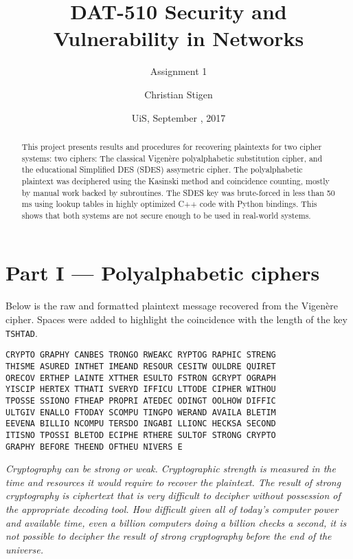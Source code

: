 \documentclass[a4paper,english,12pt]{article}
\title{DAT-510 Security and Vulnerability in Networks}
\subtitle{Assignment 1}
\author{Christian Stigen}
\date{UiS, September \nth{18}, 2017}
\begin{document}
\maketitle

\begin{abstract}
This project presents results and procedures for recovering plaintexts for two
  cipher systems: two ciphers: The classical Vigenère polyalphabetic
  substitution cipher, and the educational Simplified DES (SDES) assymetric
  cipher. The polyalphabetic plaintext was deciphered using the Kasinski method
  and coincidence counting, mostly by manual work backed by subroutines.  The
  SDES key was brute-forced in less than 50 ms using lookup tables in highly
  optimized C++ code with Python bindings. This shows that both systems are not
  secure enough to be used in real-world systems.
\end{abstract}

\section{Part I --- Polyalphabetic ciphers}

Below is the raw and formatted plaintext message recovered from the Vigenère
cipher\cite{wiki:vigenere, wiki:polyalphabetic}. Spaces were added to highlight
the coincidence with the length of the key \texttt{TSHTAD}.

\begin{verbatim}
CRYPTO GRAPHY CANBES TRONGO RWEAKC RYPTOG RAPHIC STRENG
THISME ASURED INTHET IMEAND RESOUR CESITW OULDRE QUIRET
ORECOV ERTHEP LAINTE XTTHER ESULTO FSTRON GCRYPT OGRAPH
YISCIP HERTEX TTHATI SVERYD IFFICU LTTODE CIPHER WITHOU
TPOSSE SSIONO FTHEAP PROPRI ATEDEC ODINGT OOLHOW DIFFIC
ULTGIV ENALLO FTODAY SCOMPU TINGPO WERAND AVAILA BLETIM
EEVENA BILLIO NCOMPU TERSDO INGABI LLIONC HECKSA SECOND
ITISNO TPOSSI BLETOD ECIPHE RTHERE SULTOF STRONG CRYPTO
GRAPHY BEFORE THEEND OFTHEU NIVERS E
\end{verbatim}

\textit{Cryptography can be strong or weak. Cryptographic strength is measured
in the time and resources it would require to recover the plaintext.  The
result of strong cryptography is ciphertext that is very difficult to decipher
without possession of the appropriate decoding tool. How difficult given all of
today's computer power and available time, even a billion computers doing a
billion checks a second, it is not possible to decipher the result of strong
cryptography before the end of the universe.}
\end{document}
